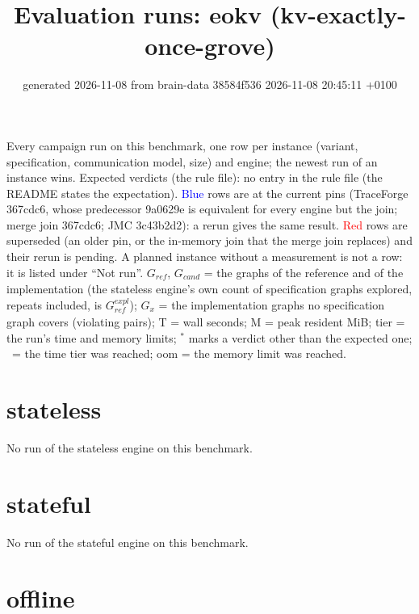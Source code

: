 \documentclass[10pt]{article}
\title{Evaluation runs: \textsf{eokv} (kv-exactly-once-grove)}
\author{}
\date{generated 2026-11-08 from brain-data 38584f536 2026-11-08 20:45:11 +0100}
\begin{document}
\maketitle\small
\noindent Every campaign run on this benchmark, one row per instance (variant, specification, communication model, size) and engine; the newest run of an instance wins. Expected verdicts (the rule file): no entry in the rule file (the README states the expectation). \textcolor{blue}{Blue} rows are at the current pins (TraceForge 367cdc6, whose predecessor 9a0629e is equivalent for every engine but the join; merge join 367cdc6; JMC 3c43b2d2): a rerun gives the same result. \textcolor{red}{Red} rows are superseded (an older pin, or the in-memory join that the merge join replaces) and their rerun is pending. A planned instance without a measurement is not a row: it is listed under ``Not run''. $G_{\mathit{ref}}$, $G_{\mathit{cand}}$ = the graphs of the reference and of the implementation (the stateless engine's own count of specification graphs explored, repeats included, is $G_{\mathit{ref}}^{\mathit{expl}}$); $G_x$ = the implementation graphs no specification graph covers (violating pairs); T = wall seconds; M = peak resident MiB; tier = the run's time and memory limits; $^{\ast}$ marks a verdict other than the expected one; \faClock\ = the time tier was reached; oom = the memory limit was reached.

\section*{stateless}\noindent No run of the stateless engine on this benchmark.
\section*{stateful}\noindent No run of the stateful engine on this benchmark.
\section*{offline}
\end{document}
